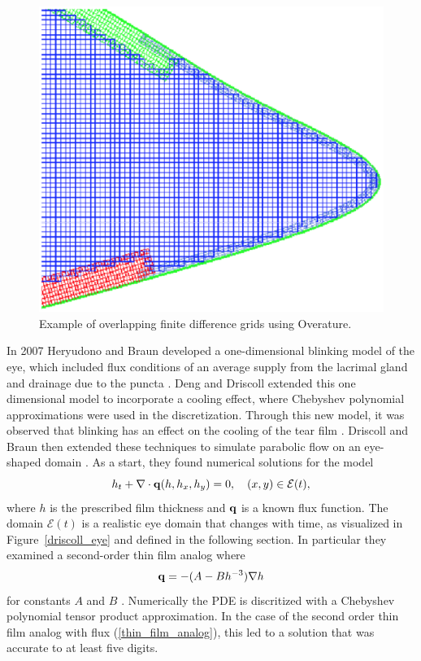 \begin{figure}
	\centering
	\includegraphics[scale=0.6]{Chapter4/overature_eye}
	\caption{Example of overlapping finite difference grids using Overature. }
	\label{overature_eye}
\end{figure}


In 2007 Heryudono and Braun developed a one-dimensional blinking model of the eye, which included flux conditions of an average supply from the lacrimal gland and drainage due to the puncta \cite{heryudono2007single}. Deng and Driscoll extended this one dimensional model to incorporate a cooling effect, where Chebyshev polynomial approximations were used in the discretization. Through this new model, it was observed that blinking has an effect on the cooling of the tear film \cite{deng2013model,deng2014heat}. Driscoll and Braun then extended these techniques to simulate parabolic flow on an eye-shaped domain \cite{driscoll2018simulation}. As a start, they found numerical solutions for the model
\begin{equation}
\label{driscollPDE}
h_t + \nabla \cdot \mathbf{q} (h,h_x,h_y)=0, \quad (x,y) \in \mathcal{E}(t),
\end{equation}
where $h$ is the prescribed film thickness and $\mathbf{q}$ is a known flux function. The domain $\mathcal{E}(t)$ is a realistic eye domain that changes with time, as visualized in Figure~\ref{driscoll_eye} and defined in the following section. In particular they examined a second-order thin film analog where
\begin{equation}
\label{thin_film_analog}
\mathbf{q} = -(A-B h^{-3})\nabla h
\end{equation}
for constants $A$ and $B$ \cite{driscoll2018simulation}. Numerically the PDE is discritized with a Chebyshev polynomial tensor product approximation. In the case of the second order thin film analog with flux (\ref{thin_film_analog}), this led to a solution that was accurate to at least five digits.

